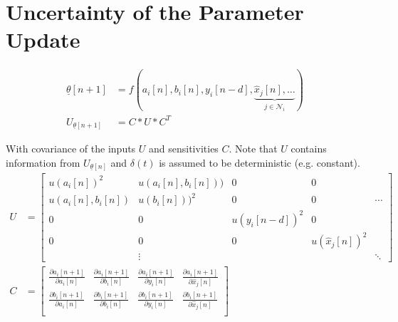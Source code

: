\documentclass[10pt,a4paper,onecolumn]{article}
\renewcommand{\vec}[1]{\underline{#1}}
\begin{document}
    \section{Uncertainty of the Parameter Update}
    \begin{align}
        \vec{\theta}[n+1] &= f(a_i[n], b_i[n], y_i[n-d], \underbrace{\hat{x}_j[n], \dots}_{j \in \mathcal{N}_i}) \\
        U_{\vec{\theta}[n+1]} &= C * U * C^T
    \end{align}
    
    With covariance of the inputs $U$ and sensitivities $C$. Note that $U$ contains information from $U_{\vec{\theta}[n]}$ and $\delta(t)$ is assumed to be deterministic (e.g. constant). 
    \begin{align}
        U &= 
        \begin{bmatrix}
            u(a_i[n])^2 & u(a_i[n], b_i[n])) & 0 & 0 & \\
            u(a_i[n], b_i[n]) & u(b_i[n]))^2 & 0 & 0 & \cdots \\
            0 & 0 & u(y_i[n-d])^2 & 0 & \\
            0 & 0 & 0 & u(\hat{x}_j[n])^2 & \\
            & \vdots & & & \ddots
        \end{bmatrix} \\
        C &=
        \begin{bmatrix}
            \frac{\partial a_i[n+1]}{\partial a_i[n]} & \frac{\partial a_i[n+1]}{\partial b_i[n]} & \frac{\partial a_i[n+1]}{\partial y_i[n]} & \frac{\partial a_i[n+1]}{\partial \hat{x}_j[n]} \\
            \frac{\partial b_i[n+1]}{\partial a_i[n]} & \frac{\partial b_i[n+1]}{\partial b_i[n]} & \frac{\partial b_i[n+1]}{\partial y_i[n]} & \frac{\partial b_i[n+1]}{\partial \hat{x}_j[n]} \\
        \end{bmatrix}
    \end{align}
    
\end{document}
